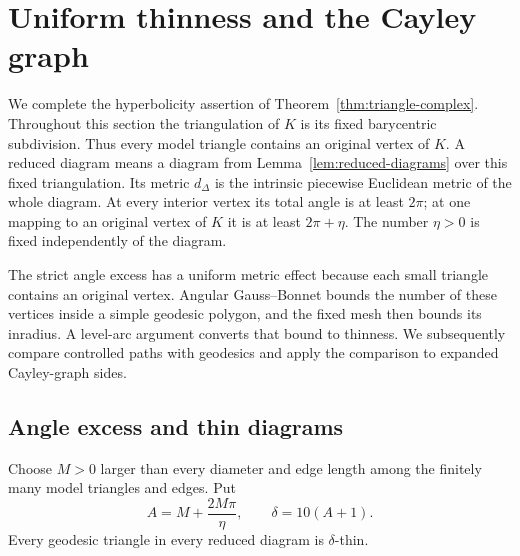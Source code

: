\section{Uniform thinness and the Cayley graph}
\label{sec:geometry-thinness}

We complete the hyperbolicity assertion of
Theorem~\ref{thm:triangle-complex}. Throughout this section the triangulation
of $K$ is its fixed barycentric subdivision. Thus every model triangle
contains an original vertex of $K$. A reduced diagram means a diagram from
Lemma~\ref{lem:reduced-diagrams} over this fixed triangulation. Its metric
$d_\Delta$ is the intrinsic piecewise Euclidean metric of the whole
diagram. At every interior vertex its total angle is at least $2\pi$;
at one mapping to an original vertex of $K$ it is at least $2\pi+\eta$.
The number $\eta>0$ is fixed independently of the diagram.

The strict angle excess has a uniform metric effect because each small
triangle contains an original vertex. Angular Gauss--Bonnet bounds the
number of these vertices inside a simple geodesic polygon, and the fixed
mesh then bounds its inradius. A level-arc argument converts that bound
to thinness. We subsequently compare controlled paths with geodesics and
apply the comparison to expanded Cayley-graph sides.

\subsection{Angle excess and thin diagrams}

\begin{lemma}
\label{lem:diagram-thinness}
Choose $M>0$ larger than every diameter and edge length among the finitely
many model triangles and edges. Put
\[
 A=M+\frac{2M\pi}{\eta},\qquad \delta=10(A+1).
\]
Every geodesic triangle in every reduced diagram is $\delta$-thin.
\end{lemma}

